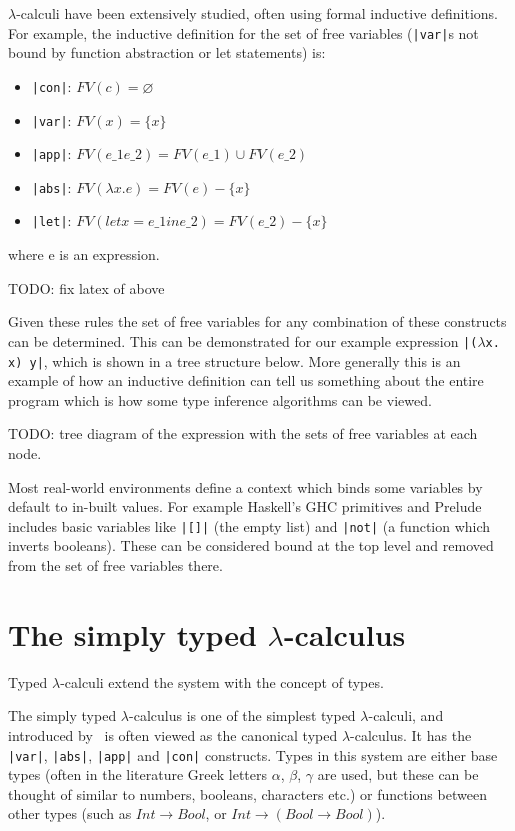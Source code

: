 \documentclass[a4paper,fleqn,twoside,12pt]{report}
\begin{document}
$\lambda$-calculi have been extensively studied, often using formal inductive definitions. For example, the inductive definition for the set of free variables (\texttt{|var|}s not bound by function abstraction or let statements) is:
\begin{itemize}
  \item \texttt{|con|}: $FV(c) = \varnothing$
  \item \texttt{|var|}: $FV(x) = \{ x \}$
  \item \texttt{|app|}: $FV(e\_1 e\_2) = FV(e\_1) \cup FV(e\_2)$
  \item \texttt{|abs|}: $FV(\lambda x. e) = FV(e) - \{ x \}$
  \item \texttt{|let|}: $FV(let x = e\_1 in e\_2) = FV(e\_2) - \{ x \}$
\end{itemize}
where e is an expression.

TODO: fix latex of above

Given these rules the set of free variables for any combination of these constructs can be determined. This can be demonstrated for our example expression \texttt{|($\lambda$x. x) y|}, which is shown in a tree structure below. More generally this is an example of how an inductive definition can tell us something about the entire program which is how some type inference algorithms can be viewed.

TODO: tree diagram of the expression with the sets of free variables at each node.

Most real-world environments define a context which binds some variables by default to in-built values. For example Haskell’s GHC primitives and Prelude includes basic variables like \texttt{|[]|} (the empty list) and \texttt{|not|} (a function which inverts booleans). These can be considered bound at the top level and removed from the set of free variables there.
\section{The simply typed $\lambda$-calculus}\label{id:h.w7vj0r89b86n}
Typed $\lambda$-calculi extend the system with the concept of types.

The simply typed $\lambda$-calculus is one of the simplest typed $\lambda$-calculi, and introduced by~\cite{ref11} is often viewed as the canonical typed $\lambda$-calculus. It has the \texttt{|var|}, \texttt{|abs|}, \texttt{|app|} and \texttt{|con|} constructs. Types in this system are either base types (often in the literature Greek letters $\alpha$, $\beta$, $\gamma$ are used, but these can be thought of similar to numbers, booleans, characters etc.) or functions between other types (such as $Int \rightarrow Bool$, or $Int \rightarrow (Bool \rightarrow Bool)$).
\end{document}

